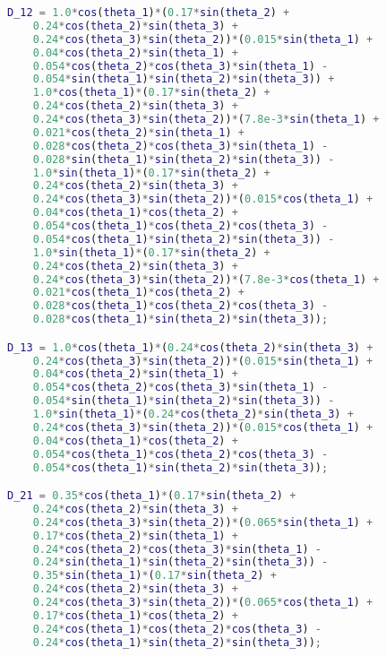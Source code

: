 \begin{anexosenv}
\begin{lstlisting}[language=Matlab]
D_12 = 1.0*cos(theta_1)*(0.17*sin(theta_2) +
    0.24*cos(theta_2)*sin(theta_3) + 
    0.24*cos(theta_3)*sin(theta_2))*(0.015*sin(theta_1) +
    0.04*cos(theta_2)*sin(theta_1) + 
    0.054*cos(theta_2)*cos(theta_3)*sin(theta_1) -
    0.054*sin(theta_1)*sin(theta_2)*sin(theta_3)) + 
    1.0*cos(theta_1)*(0.17*sin(theta_2) +
    0.24*cos(theta_2)*sin(theta_3) + 
    0.24*cos(theta_3)*sin(theta_2))*(7.8e-3*sin(theta_1) +
    0.021*cos(theta_2)*sin(theta_1) + 
    0.028*cos(theta_2)*cos(theta_3)*sin(theta_1) -
    0.028*sin(theta_1)*sin(theta_2)*sin(theta_3)) - 
    1.0*sin(theta_1)*(0.17*sin(theta_2) +
    0.24*cos(theta_2)*sin(theta_3) + 
    0.24*cos(theta_3)*sin(theta_2))*(0.015*cos(theta_1) +
    0.04*cos(theta_1)*cos(theta_2) + 
    0.054*cos(theta_1)*cos(theta_2)*cos(theta_3) -
    0.054*cos(theta_1)*sin(theta_2)*sin(theta_3)) - 
    1.0*sin(theta_1)*(0.17*sin(theta_2) +
    0.24*cos(theta_2)*sin(theta_3) + 
    0.24*cos(theta_3)*sin(theta_2))*(7.8e-3*cos(theta_1) +
    0.021*cos(theta_1)*cos(theta_2) + 
    0.028*cos(theta_1)*cos(theta_2)*cos(theta_3) -
    0.028*cos(theta_1)*sin(theta_2)*sin(theta_3));

D_13 = 1.0*cos(theta_1)*(0.24*cos(theta_2)*sin(theta_3) + 
    0.24*cos(theta_3)*sin(theta_2))*(0.015*sin(theta_1) +
    0.04*cos(theta_2)*sin(theta_1) + 
    0.054*cos(theta_2)*cos(theta_3)*sin(theta_1) -
    0.054*sin(theta_1)*sin(theta_2)*sin(theta_3)) - 
    1.0*sin(theta_1)*(0.24*cos(theta_2)*sin(theta_3) +
    0.24*cos(theta_3)*sin(theta_2))*(0.015*cos(theta_1) + 
    0.04*cos(theta_1)*cos(theta_2) +
    0.054*cos(theta_1)*cos(theta_2)*cos(theta_3) - 
    0.054*cos(theta_1)*sin(theta_2)*sin(theta_3));

D_21 = 0.35*cos(theta_1)*(0.17*sin(theta_2) +
    0.24*cos(theta_2)*sin(theta_3) + 
    0.24*cos(theta_3)*sin(theta_2))*(0.065*sin(theta_1) +
    0.17*cos(theta_2)*sin(theta_1) + 
    0.24*cos(theta_2)*cos(theta_3)*sin(theta_1) -
    0.24*sin(theta_1)*sin(theta_2)*sin(theta_3)) - 
    0.35*sin(theta_1)*(0.17*sin(theta_2) +
    0.24*cos(theta_2)*sin(theta_3) + 
    0.24*cos(theta_3)*sin(theta_2))*(0.065*cos(theta_1) +
    0.17*cos(theta_1)*cos(theta_2) + 
    0.24*cos(theta_1)*cos(theta_2)*cos(theta_3) -
    0.24*cos(theta_1)*sin(theta_2)*sin(theta_3));


\end{lstlisting}
\end{anexosenv}
